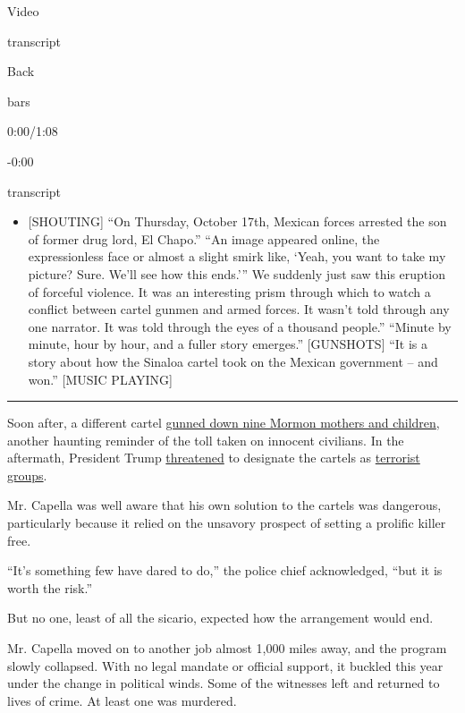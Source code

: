 Video

transcript

Back

bars

0:00/1:08

-0:00

transcript

\begin{itemize}
\tightlist
\item
  {[}SHOUTING{]} ``On Thursday, October 17th, Mexican forces arrested
  the son of former drug lord, El Chapo.'' ``An image appeared online,
  the expressionless face or almost a slight smirk like, `Yeah, you want
  to take my picture? Sure. We'll see how this ends.''' We suddenly just
  saw this eruption of forceful violence. It was an interesting prism
  through which to watch a conflict between cartel gunmen and armed
  forces. It wasn't told through any one narrator. It was told through
  the eyes of a thousand people.'' ``Minute by minute, hour by hour, and
  a fuller story emerges.'' {[}GUNSHOTS{]} ``It is a story about how the
  Sinaloa cartel took on the Mexican government -- and won.'' {[}MUSIC
  PLAYING{]}
\end{itemize}

\begin{center}\rule{0.5\linewidth}{\linethickness}\end{center}

Soon after, a different cartel
\href{https://www.nytimes3xbfgragh.onion/2019/11/07/world/americas/mexico-mormon-massacre.html?action=click\&module=News\&pgtype=Homepage}{gunned
down nine Mormon mothers and children}, another haunting reminder of the
toll taken on innocent civilians. In the aftermath, President Trump
\href{https://www.nytimes3xbfgragh.onion/2019/12/06/us/trump-drug-cartels-terrorists.html}{threatened}
to designate the cartels as
\href{https://www.nytimes3xbfgragh.onion/2019/11/27/world/mexico-trump-terrorist-cartel.html}{terrorist
groups}.

Mr. Capella was well aware that his own solution to the cartels was
dangerous, particularly because it relied on the unsavory prospect of
setting a prolific killer free.

``It's something few have dared to do,'' the police chief acknowledged,
``but it is worth the risk.''

But no one, least of all the sicario, expected how the arrangement would
end.

Mr. Capella moved on to another job almost 1,000 miles away, and the
program slowly collapsed. With no legal mandate or official support, it
buckled this year under the change in political winds. Some of the
witnesses left and returned to lives of crime. At least one was
murdered.


